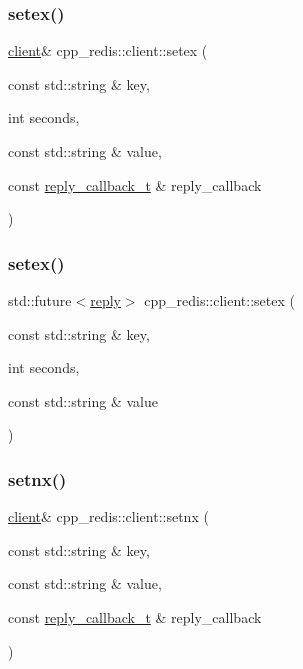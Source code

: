 \subsubsection{\texorpdfstring{setex()}{setex()}\hspace{0.1cm}{\footnotesize\ttfamily [1/2]}}
{\footnotesize\ttfamily \hyperlink{classcpp__redis_1_1client}{client}\& cpp\+\_\+redis\+::client\+::setex (\begin{DoxyParamCaption}\item[{const std\+::string \&}]{key,  }\item[{int}]{seconds,  }\item[{const std\+::string \&}]{value,  }\item[{const \hyperlink{classcpp__redis_1_1client_a061a1140d36d2eaeda82b09a0bb3f9f2}{reply\+\_\+callback\+\_\+t} \&}]{reply\+\_\+callback }\end{DoxyParamCaption})}

\mbox{\label{classcpp__redis_1_1client_a14f1f1c9f50437585a8e758d1a004a67}} 
\subsubsection{\texorpdfstring{setex()}{setex()}\hspace{0.1cm}{\footnotesize\ttfamily [2/2]}}
{\footnotesize\ttfamily std\+::future$<$\hyperlink{classcpp__redis_1_1reply}{reply}$>$ cpp\+\_\+redis\+::client\+::setex (\begin{DoxyParamCaption}\item[{const std\+::string \&}]{key,  }\item[{int}]{seconds,  }\item[{const std\+::string \&}]{value }\end{DoxyParamCaption})}

\mbox{\label{classcpp__redis_1_1client_ad701f8b9e3769986b1af97049b52de83}} 
\subsubsection{\texorpdfstring{setnx()}{setnx()}\hspace{0.1cm}{\footnotesize\ttfamily [1/2]}}
{\footnotesize\ttfamily \hyperlink{classcpp__redis_1_1client}{client}\& cpp\+\_\+redis\+::client\+::setnx (\begin{DoxyParamCaption}\item[{const std\+::string \&}]{key,  }\item[{const std\+::string \&}]{value,  }\item[{const \hyperlink{classcpp__redis_1_1client_a061a1140d36d2eaeda82b09a0bb3f9f2}{reply\+\_\+callback\+\_\+t} \&}]{reply\+\_\+callback }\end{DoxyParamCaption})}

